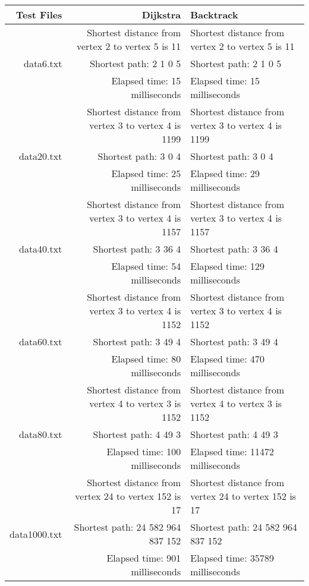 \documentclass{article}
\begin{document}
\hskip-2.0cm\begin{tabular}[h]{|r|r|l|}\hline
Test Files & Dijkstra & Backtrack \\ \hline
&Shortest distance from vertex 2 to vertex 5 is 11 & Shortest distance from vertex 2 to vertex 5 is 11 \\
data6.txt & Shortest path: 2 1 0 5 & Shortest path: 2 1 0 5 \\
&Elapsed time: 15 milliseconds & Elapsed time: 15 milliseconds \\ \hline
&Shortest distance from vertex 3 to vertex 4 is 1199 & Shortest distance from vertex 3 to vertex 4 is 1199\\
data20.txt&Shortest path: 3 0 4  & Shortest path: 3 0 4 \\
&Elapsed time: 25 milliseconds & Elapsed time: 29 milliseconds \\ \hline
&Shortest distance from vertex 3 to vertex 4 is 1157 & Shortest distance from vertex 3 to vertex 4 is 1157\\
data40.txt&Shortest path: 3 36 4 & Shortest path: 3 36 4 \\
&Elapsed time: 54 milliseconds & Elapsed time: 129 milliseconds \\ \hline
&Shortest distance from vertex 3 to vertex 4 is 1152 & Shortest distance from vertex 3 to vertex 4 is 1152\\
data60.txt&Shortest path: 3 49 4 & Shortest path: 3 49 4 \\
&Elapsed time: 80 milliseconds & Elapsed time: 470 milliseconds \\ \hline
&Shortest distance from vertex 4 to vertex 3 is 1152 & Shortest distance from vertex 4 to vertex 3 is 1152\\
data80.txt&Shortest path: 4 49 3 & Shortest path: 4 49 3 \\
&Elapsed time: 100 milliseconds & Elapsed time: 11472 milliseconds \\ \hline
&Shortest distance from vertex 24 to vertex 152 is 17 & Shortest distance from vertex 24 to vertex 152 is 17\\
data1000.txt&Shortest path: 24 582 964 837 152 & Shortest path: 24 582 964 837 152 \\
&Elapsed time: 901 milliseconds & Elapsed time: 35789 milliseconds \\ \hline
\end{tabular}
\end{document}
